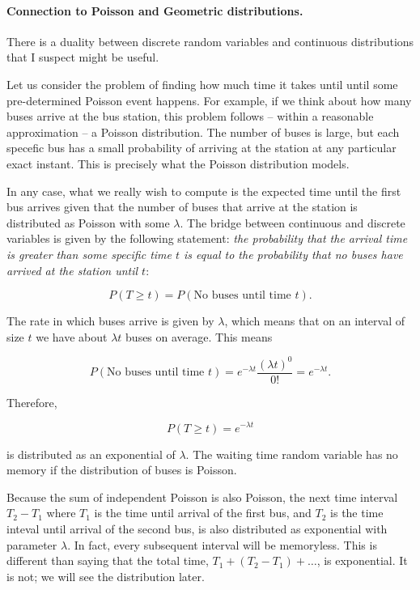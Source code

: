 \documentclass[12pt]{article}
\begin{document}
\paragraph{Connection to Poisson and Geometric distributions.}
There is a duality between discrete random variables and continuous distributions that I
suspect might be useful.

Let us consider the problem of finding how much time it takes until until
some pre-determined Poisson event happens.
For example, if we think about how many buses arrive at the bus station, this 
problem follows -- within a reasonable approximation -- a Poisson distribution.
The number of buses is large, but each specefic bus has a small probability
of arriving at the station at any particular exact instant.
This is precisely what the Poisson distribution models.

In any case, what we really wish to compute is
the expected time until the first bus arrives given that 
the number of buses that arrive at the station is distributed as Poisson
with some $\lambda$.
The bridge between continuous and discrete variables is 
given by the following statement:
\textit{the probability that the arrival time is greater than
some specific time $t$ is equal to the probability that no buses have
arrived at the station until $t$}:

\begin{equation}
P(T \geq t) = P ( \text{No buses until time } t ).
\end{equation}

\noindent
The rate in which buses arrive is given by $\lambda$, which means
that on an interval of size $t$ we have about $\lambda t$ buses on average.
This means

\begin{equation}
P ( \text{No buses until time } t ) = e^{- \lambda t} \frac{(\lambda t)^{0}}{0!} = e^{-\lambda t}.
\end{equation}

\noindent
Therefore, 

\begin{equation}
P(T \geq t) = e^{-\lambda t}
\end{equation}

\noindent
is distributed as an exponential of $\lambda$. 
The waiting time random variable has no memory if the distribution of buses is Poisson.

Because the sum of independent Poisson is also Poisson, the next time interval
$T_{2} - T_{1}$ where $T_{1}$ is the time until arrival of the first bus, and
$T_{2}$ is the time inteval until arrival of the second bus, is also
distributed as exponential with parameter $\lambda$.
In fact, every subsequent interval will be memoryless.
This is different than saying that the total time, $T_{1} + (T_{2} - T_{1}) + \ldots$, is
exponential. It is not; we will see the distribution later.
\end{document}

